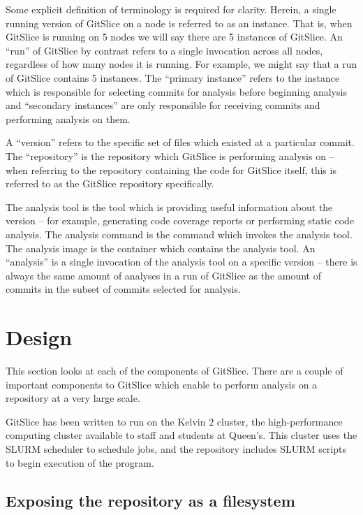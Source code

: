 \documentclass[11pt]{article}
\begin{document}
    Some explicit definition of terminology is required for clarity.  Herein, a single running version of GitSlice on a node is referred to as an instance.  That is, when GitSlice is running on 5 nodes we will say there are 5 instances of GitSlice.  An ``run'' of GitSlice by contrast refers to a single invocation across all nodes, regardless of how many nodes it is running.  For example, we might say that a run of GitSlice contains 5 instances.  The ``primary instance'' refers to the instance which is responsible for selecting commits for analysis before beginning analysis and ``secondary instances'' are only responsible for receiving commits and performing analysis on them.

    A ``version'' refers to the specific set of files which existed at a particular commit.  The ``repository'' is the repository which GitSlice is performing analysis on – when referring to the repository containing the code for GitSlice itself, this is referred to as the GitSlice repository specifically.

    The analysis tool is the tool which is providing useful information about the version – for example, generating code coverage reports or performing static code analysis.  The analysis command is the command which invokes the analysis tool.  The analysis image is the container which contains the analysis tool.  An ``analysis'' is a single invocation of the analysis tool on a specific version – there is always the same amount of analyses in a run of GitSlice as the amount of commits in the subset of commits selected for analysis.

    \section{Design}\label{sec:design}

    This section looks at each of the components of GitSlice.
    There are a couple of important components to GitSlice which enable to perform analysis on a repository at a very large scale.

    GitSlice has been written to run on the Kelvin 2 cluster, the high-performance computing cluster available to staff and students at Queen's.
    This cluster uses the SLURM scheduler to schedule jobs, and the repository \cite{gitlab} includes SLURM scripts to begin execution of the program.

    \subsection{Exposing the repository as a filesystem}\label{subsec:exposing-the-repository-as-a-filesystem}
\end{document}
